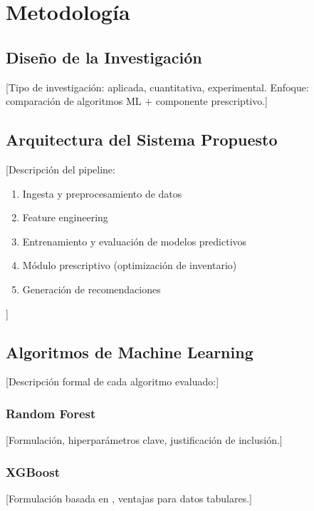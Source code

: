 \section{Metodolog\'{i}a}
\label{sec:methodology}

\subsection{Dise\~{n}o de la Investigaci\'{o}n}
\label{subsec:design}

[Tipo de investigaci\'{o}n: aplicada, cuantitativa, experimental. Enfoque: comparaci\'{o}n de algoritmos ML + componente prescriptivo.]

\subsection{Arquitectura del Sistema Propuesto}
\label{subsec:architecture}

[Descripci\'{o}n del pipeline:
\begin{enumerate}
    \item Ingesta y preprocesamiento de datos
    \item Feature engineering
    \item Entrenamiento y evaluaci\'{o}n de modelos predictivos
    \item M\'{o}dulo prescriptivo (optimizaci\'{o}n de inventario)
    \item Generaci\'{o}n de recomendaciones
\end{enumerate}]

\subsection{Algoritmos de Machine Learning}
\label{subsec:algorithms}

[Descripci\'{o}n formal de cada algoritmo evaluado:]

\subsubsection{Random Forest}
[Formulaci\'{o}n, hiperpar\'{a}metros clave, justificaci\'{o}n de inclusi\'{o}n.]

\subsubsection{XGBoost}
[Formulaci\'{o}n basada en \cite{chen2016xgboost}, ventajas para datos tabulares.]


